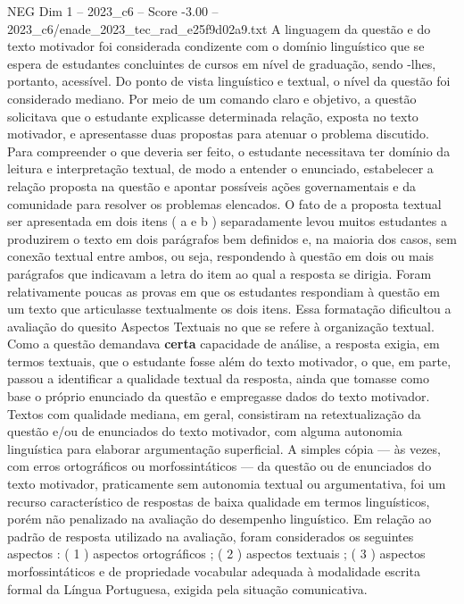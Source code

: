 \begin{textsample}{NEG Dim 1 – 2023\_c6 – Score -3.00 – 2023\_c6/enade\_2023\_tec\_rad\_e25f9d02a9.txt}
A linguagem da questão e do texto motivador foi considerada condizente com o domínio linguístico que se espera de estudantes concluintes de cursos em nível de graduação, sendo -lhes, portanto, acessível.
Do ponto de vista linguístico e textual, o nível da questão foi considerado mediano.
Por meio de um comando claro e objetivo, a questão solicitava que o estudante explicasse determinada relação, exposta no texto motivador, e apresentasse duas propostas para atenuar o problema discutido.
Para compreender o que deveria ser feito, o estudante necessitava ter domínio da leitura e interpretação textual, de modo a entender o enunciado, estabelecer a relação proposta na questão e apontar possíveis ações governamentais e da comunidade para resolver os problemas elencados.
O fato de a proposta textual ser apresentada em dois itens ( a e b ) separadamente levou muitos estudantes a produzirem o texto em dois parágrafos bem definidos e, na maioria dos casos, sem conexão textual entre ambos, ou seja, respondendo à questão em dois ou mais parágrafos que indicavam a letra do item ao qual a resposta se dirigia.
Foram relativamente poucas as provas em que os estudantes respondiam à questão em um texto que articulasse textualmente os dois itens.
Essa formatação dificultou a avaliação do quesito Aspectos Textuais no que se refere à organização textual.
Como a questão demandava \textbf{certa} capacidade de análise, a resposta exigia, em termos textuais, que o estudante fosse além do texto motivador, o que, em parte, passou a identificar a qualidade textual da resposta, ainda que tomasse como base o próprio enunciado da questão e empregasse dados do texto motivador.
Textos com qualidade mediana, em geral, consistiram na retextualização da questão e/ou de enunciados do texto motivador, com alguma autonomia linguística para elaborar argumentação superficial.
A simples cópia — às vezes, com erros ortográficos ou morfossintáticos — da questão ou de enunciados do texto motivador, praticamente sem autonomia textual ou argumentativa, foi um recurso característico de respostas de baixa qualidade em termos linguísticos, porém não penalizado na avaliação do desempenho linguístico.
Em relação ao padrão de resposta utilizado na avaliação, foram considerados os seguintes aspectos : ( 1 ) aspectos ortográficos ; ( 2 ) aspectos textuais ; ( 3 ) aspectos morfossintáticos e de propriedade vocabular adequada à modalidade escrita formal da Língua Portuguesa, exigida pela situação comunicativa.

\end{textsample}
